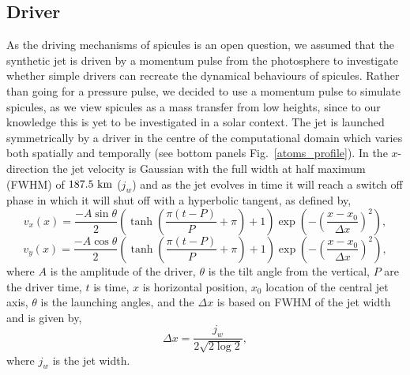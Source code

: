 \subsection{Driver}
\label{subsec:driver}
As the driving mechanisms of spicules is an open question, we assumed that the synthetic jet is driven by a momentum pulse from the photosphere to investigate whether simple drivers can recreate the dynamical behaviours of spicules. Rather than going for a pressure pulse, we decided to use a momentum pulse to simulate spicules, as we view spicules as a mass transfer from low heights, since to our knowledge this is yet to be investigated in a solar context. The jet is launched symmetrically by a driver in the centre of the computational domain which varies both spatially and temporally (see bottom panels Fig.~\ref{atoms_profile}). In the $x$-direction the jet velocity is Gaussian with the full width at half maximum (FWHM) of $187.5~\rm{km}$ ($j_w$) and as the jet evolves in time it will reach a switch off phase in which it will shut off with a hyperbolic tangent, as defined by,
\begin{equation}
    v_x(x) = \frac{-A\sin{\theta}}{2}\left( \tanh{\left( \frac{\pi (t-P)}{P}+ \pi \right) +1 } \right) \exp \left( - \left(\frac{x-x_0}{\Delta x} \right)^2  \right),
\end{equation}
\begin{equation}
    v_y(x) = \frac{-A\cos{\theta}}{2}\left( \tanh{\left( \frac{\pi (t-P)}{P}+ \pi \right) +1 } \right) \exp \left( - \left(\frac{x-x_0}{\Delta x} \right)^2  \right),
\end{equation}
where $A$ is the amplitude of the driver, $\theta$ is the tilt angle from the vertical, $P$ are the driver time, $t$ is time, $x$ is horizontal position, $x_0$ location of the central jet axis, $\theta$ is the launching angles, and the $\Delta x$ is based on FWHM of the jet width and is given by,
\begin{equation}
\Delta x = \dfrac{j_w}{2 \sqrt{2 \log{2}}},
\end{equation}
where $j_w$ is the jet width.